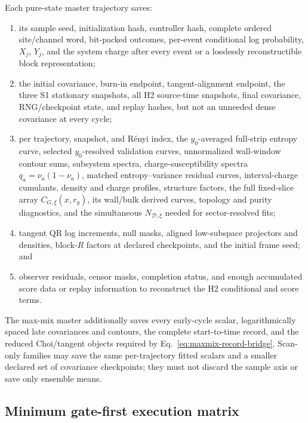\documentclass[aps,prx,onecolumn,nofootinbib,superscriptaddress,longbibliography]{revtex4-2}
\begin{document}
Each pure-state master trajectory saves:
\begin{enumerate}
\item its sample seed, initialization hash, controller hash, complete ordered site/channel
word, bit-packed outcomes, per-event conditional log probability, $X_j$, $Y_j$, and the
system charge after every event or a losslessly reconstructible block representation;
\item the initial covariance, burn-in endpoint, tangent-alignment endpoint, the three S1
stationary snapshots, all H2 source-time snapshots, final covariance, RNG/checkpoint state,
and replay hashes, but not an unneeded dense covariance at every cycle;
\item per trajectory, snapshot, and R\'enyi index, the $y_0$-averaged full-strip entropy
curve, selected $y_0$-resolved validation curves, unnormalized wall-window contour sums,
subsystem spectra, charge-susceptibility spectra $q_a=\nu_a(1-\nu_a)$, matched
entropy--variance residual curves, interval-charge cumulants, density and charge profiles, structure
factors, the full fixed-slice array $C_{G,\xi}(x,r_y)$, its wall/bulk derived curves,
topology and purity diagnostics, and the simultaneous
$N_{\mathcal D,\xi}$ needed for sector-resolved fits;
\item tangent QR log increments, null masks, aligned low-subspace projectors and densities,
block-$R$ factors at declared checkpoints, and the initial frame seed; and
\item observer residuals, censor masks, completion status, and enough accumulated score data
or replay information to reconstruct the H2 conditional and score terms.
\end{enumerate}
The max-mix master additionally saves every early-cycle scalar, logarithmically spaced late
covariances and contours, the complete start-to-time record, and the reduced Choi/tangent
objects required by Eq.~\eqref{eq:maxmix-record-bridge}.  Scan-only families may save the
same per-trajectory fitted scalars and a smaller declared set of covariance checkpoints;
they must not discard the sample axis or save only ensemble means.

\subsection{Minimum gate-first execution matrix}
\end{document}
